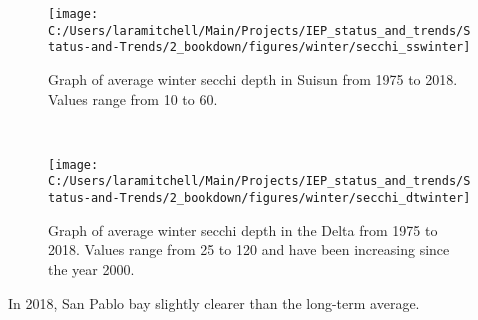 \documentclass[
]{book}
\begin{document}
\begin{panel-grid}
\begin{columns-nocenter}
\begin{column40}
\end{column40}

\begin{column800}

\begin{expand}

\begin{figure}
\texttt{[image: C:/Users/laramitchell/Main/Projects/IEP\_status\_and\_trends/Status-and-Trends/2\_bookdown/figures/winter/secchi\_sswinter]} \caption{Graph of average winter secchi depth in Suisun from 1975 to 2018. Values range from 10 to 60.}\label{fig:unnamed-chunk-147}
\end{figure}

\end{expand}

\end{column800}

\begin{column40}

~

\end{column40}

\begin{column800}

\begin{expand}

\begin{figure}
\texttt{[image: C:/Users/laramitchell/Main/Projects/IEP\_status\_and\_trends/Status-and-Trends/2\_bookdown/figures/winter/secchi\_dtwinter]} \caption{Graph of average winter secchi depth in the Delta from 1975 to 2018. Values range from 25 to 120 and have been increasing since the year 2000.}\label{fig:unnamed-chunk-148}
\end{figure}

\end{expand}

\end{column800}

\end{columns-nocenter}

\begin{columns-nocenter}

\begin{column800}

In 2018, San Pablo bay slightly clearer than the long-term average.

\end{column800}

\begin{column40}


\end{column40}
\end{columns-nocenter}
\end{panel-grid}
\end{document}
